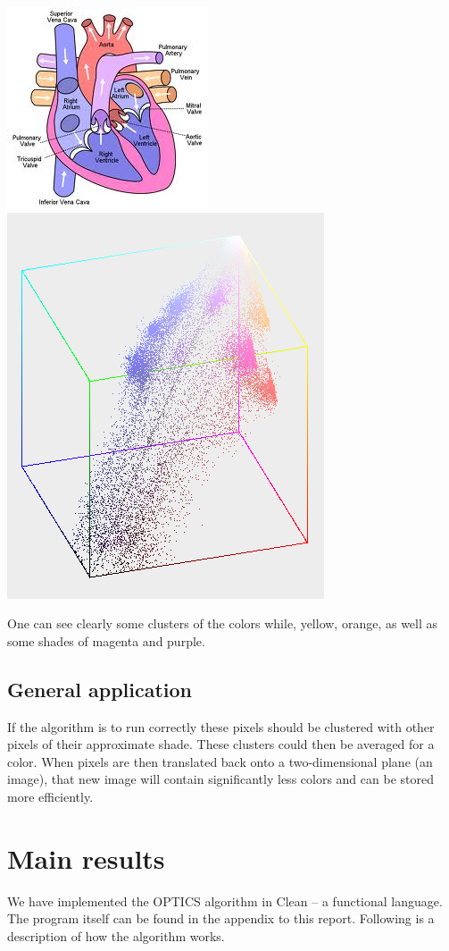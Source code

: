 \documentclass[12pt,a4paper]{article}
\begin{document}
\includegraphics[scale=0.6]{img/diagram.png}
\includegraphics[scale=0.6]{img/colorplot.png}

One can see clearly some clusters of the colors while, yellow, orange, as well as some shades of magenta and purple.

\subsection{General application}
If the algorithm is to run correctly these pixels should be clustered with other pixels of their approximate shade. These clusters could then be averaged for a color. When pixels are then translated back onto a two-dimensional plane (an image), that new image will contain significantly less colors and can be stored more efficiently.

\section{Main results}
We have implemented the OPTICS algorithm in Clean – a functional language. The program itself can be found in the appendix to this report. Following is a description of how the algorithm works.
\end{document}
